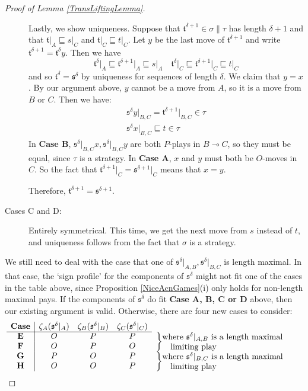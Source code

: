 \documentclass[11pt]{article} %
\theoremstyle{plain} %
\theoremstyle{definition} %
\theoremstyle{note}
\theoremstyle{exercisestyle}
\renewcommand{\implies}{\multimap}
\newcommand{\s}{\mathfrak s}
\renewcommand{\t}{\mathfrak t}
\newcommand{\prefix}{\sqsubseteq}
\begin{document}
\begin{proof}[Proof of Lemma \ref{TransLiftingLemma}]
\begin{description}
      Lastly, we show uniqueness.  Suppose that $\t^{\delta+1}\in \sigma\|\tau$ has length $\delta+1$ and that $\t\vert_A\prefix s\vert_C$ and $\t\vert_C\prefix t\vert_C$.  Let $y$ be the last move of $\t^{\delta+1}$ and write $\t^{\delta+1}=\t^\delta y$.  Then we have
      \[
        \t^\delta\vert_A\prefix \t^{\delta+1}\vert_A\prefix s\vert_A\quad\t^\delta\vert_C\prefix\t^{\delta+1}\vert_C\prefix t\vert_C
        \]
      and so $\t^\delta=\s^\delta$ by uniqueness for sequences of length $\delta$.  We claim that $y=x$.  By our argument above, $y$ cannot be a move from $A$, so it is a move from $B$ or $C$.  Then we have:
      \begin{gather*}
        \s^\delta y\vert_{B,C} = \t^{\delta+1}\vert_{B,C}\in\tau \\
        \s^\delta x\vert_{B,C} \prefix t\in\tau
      \end{gather*}
      In \textbf{Case B}, $\s^\delta\vert_{B,C}x,\s^\delta\vert_{B,C}y$ are both $P$-plays in $B\implies C$, so they must be equal, since $\tau$ is a strategy.  In \textbf{Case A}, $x$ and $y$ must both be $O$-moves in $C$.  So the fact that $\t^{\delta+1}\vert_C=\s^{\delta+1}\vert_C$ means that $x=y$.  

      Therefore, $\t^{\delta+1}=\s^{\delta+1}$.  

    \item[Cases C and D: ] Entirely symmetrical.  This time, we get the next move from $s$ instead of $t$, and uniqueness follows from the fact that $\sigma$ is a strategy. 
  \end{description}

  We still need to deal with the case that one of $\s^\delta\vert_{A,B},\s^\delta\vert_{B,C}$ is length maximal.  In that case, the `sign profile' for the components of $\s^\delta$ might not fit one of the cases in the table above, since Proposition \ref{NiceAcnGames}(i) only holds for non-length maximal pays.  If the components of $\s^\delta$ do fit \textbf{Case A, B, C or D} above, then our existing argument is valid.  Otherwise, there are four new cases to consider:
  \[
    \begin{array}{c|cccl}
      \textbf{Case} & \zeta_A(\s^\delta\vert_A) & \zeta_B(\s^\delta\vert_B) & \zeta_C(\s^\delta\vert_C) & \\
      \cline{1-4}
      \textbf{E} & O & P & P & \rdelim\}{2}{60mm}[\parbox{60mm}{\hangindent=1em where $\s^\delta\vert_{A,B}$ is a length maximal \\ limiting play}] \\
      \textbf{F} & O & P & O & \\
      \textbf{G} & P & O & P & \rdelim\}{2}{60mm}[\parbox{60mm}{\hangindent=1em where $\s^\delta\vert_{B,C}$ is a length maximal \\ limiting play}] \\
      \textbf{H} & O & O & P &
    \end{array}
    \]


\end{proof}
\end{document}

